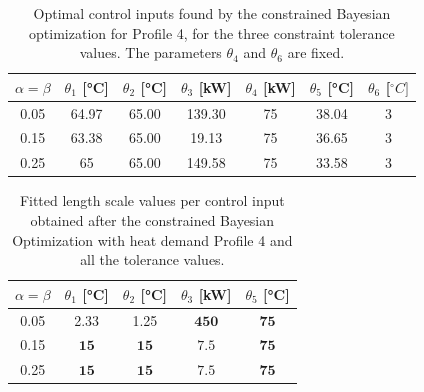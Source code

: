 \begin{table}[h!]
\centering
\caption{Optimal control inputs found by the constrained Bayesian optimization 
for Profile 4, for the three constraint tolerance values. The parameters 
$\theta_4$ and $\theta_6$ are fixed.}
\label{tab::results_profile4}
\begin{tabular}{ccccccc}
\hline
$\alpha = \beta$ & $\theta_1$ [°C] & $\theta_2$ [°C] & $\theta_3$ [kW] & $\theta_4$ [kW] & $\theta_5$ [°C] & $\theta_6$ [$^{\circ}C]$  \\
\hline
0.05 & 64.97 & 65.00 & 139.30 & 75 & 38.04 & 3 \\ 
0.15 & 63.38 & 65.00 & 19.13 & 75 & 36.65 & 3 \\ 
0.25 & 65 & 65.00 & 149.58  & 75 & 33.58 & 3 \\
\hline
\end{tabular}
\end{table}

\begin{table}[h!]
\centering
\caption{Fitted length scale values per control input obtained after the constrained Bayesian Optimization with heat demand Profile 4 and all the tolerance values.}
\label{tab::lengthscale_profile4}
\begin{tabular}{ccccc}
\hline
$\alpha = \beta$ & $\theta_1$ [°C] & $\theta_2$ [°C] & $\theta_3$ [kW] & $\theta_5$ [°C]  \\
\hline
0.05 & 2.33 & 1.25 & $\boldsymbol{450}$ & $\boldsymbol{75}$ \\
0.15 & $\boldsymbol{15}$ & $\boldsymbol{15}$ & $\boldsymbol{7.5}$ & $\boldsymbol{75}$ \\
0.25 & $\boldsymbol{15}$ & $\boldsymbol{15}$ & $\boldsymbol{7.5}$ & $\boldsymbol{75}$ \\
\hline
\end{tabular}
\end{table}

\clearpage
 

